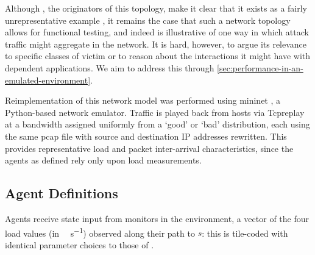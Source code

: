 \documentclass[conference, a4paper, 10pt, times]{IEEEtran}
\begin{document}
Although \citeauthor{DBLP:journals/ccr/MahajanBFIPS02a}, the originators of this topology, make it clear that it exists as a fairly unrepresentative example \cite{DBLP:journals/ccr/MahajanBFIPS02a},
it remains the case that such a network topology allows for functional testing, and indeed is illustrative of one way in which attack traffic might aggregate in the network.
It is hard, however, to argue its relevance to specific classes of victim or to reason about the interactions it might have with dependent applications.
We aim to address this through \cref{sec:performance-in-an-emulated-environment}.

Reimplementation of this network model was performed using mininet \cite{mininet}, a Python-based network emulator.
Traffic is played back from hosts via Tcpreplay at a bandwidth assigned uniformly from a `good' or `bad' distribution, each using the same pcap file with source and destination IP addresses rewritten.
This provides representative load and packet inter-arrival characteristics, since the agents as defined rely only upon load measurements.

\subsection{Agent Definitions}

Agents receive state input from monitors in the environment, a vector of the four load values (in \si{\mega\bit\per\second}) observed along their path to $s$: this is tile-coded with identical parameter choices to those of \textcite{DBLP:phd/ethos/Malialis14}.
\end{document}
